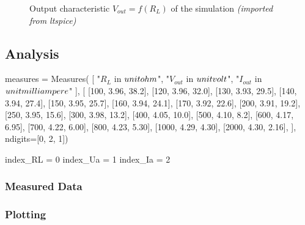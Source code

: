 \begin{figure}[H]
    \centering
    \caption{Output characteristic \textbf{$V_{out} = f(R_L)$} of the simulation \textit{(imported from ltspice)}}
\end{figure}

\subsection{Analysis}

\begin{sagesilent}
    measures = Measures(
        [
            "$R_L$ in $\\unit{\\ohm}$",
            "$V_{out}$ in $\\unit{\\volt}$", 
            "$I_{out}$ in $\\unit{\\milli\\ampere}$"
        ], [
            [100, 3.96, 38.2],
            [120, 3.96, 32.0],
            [130, 3.93, 29.5],
            [140, 3.94, 27.4],
            [150, 3.95, 25.7],
            [160, 3.94, 24.1],
            [170, 3.92, 22.6],
            [200, 3.91, 19.2],
            [250, 3.95, 15.6],
            [300, 3.98, 13.2],
            [400, 4.05, 10.0],
            [500, 4.10, 8.2],
            [600, 4.17, 6.95],
            [700, 4.22, 6.00],
            [800, 4.23, 5.30],
            [1000, 4.29, 4.30],
            [2000, 4.30, 2.16],
    ], ndigits=[0, 2, 1])

    index_RL = 0
    index_Ua = 1
    index_Ia = 2
\end{sagesilent}

\subsubsection{Measured Data}

\begin{table}
    \centering
    \renewcommand{\arraystretch}{1.2}
\end{table}

\subsubsection{Plotting}

